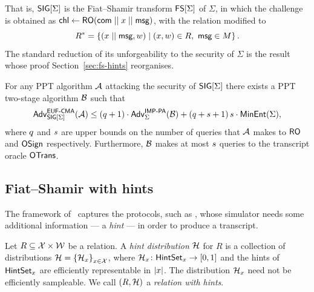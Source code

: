 That is, $\mathsf{SIG}[\Sigma]$ is the Fiat--Shamir transform $\mathsf{FS}[\Sigma]$ of $\Sigma$,
in which the challenge is obtained as $\mathsf{chl} \gets \mathsf{RO}(\mathsf{com} \mathrel{||} x \mathrel{||}
\textsf{msg})$, with the relation modified to
\begin{equation}
    R^* = \left\{(x \mathrel{||} \textsf{msg}, w) \;\middle|\; (x,w) \in R,\ \textsf{msg} \in M\right\}.
\end{equation}
The standard reduction of its unforgeability to the \IMPPA security of $\Sigma$
is the result whose proof Section~\ref{sec:fs-hints} reorganises.

\begin{lemma}\label{lem:aabn}
    For any PPT algorithm $\mathcal{A}$ attacking the \EUFCMA security of
    $\mathsf{SIG}[\Sigma]$ there exists a PPT two-stage algorithm $\mathcal{B}$ such that
    \begin{equation}\label{eq:aabn}
        \mathsf{Adv}^{\mathsf{EUF}\text{-}\mathsf{CMA}}_{\mathsf{SIG}[\Sigma]}(\mathcal{A}) \leq
        (q + 1) \cdot \mathsf{Adv}^{\mathsf{IMP}\text{-}\mathsf{PA}}_{\Sigma}(\mathcal{B})
        + (q + s + 1)\,s \cdot \mathsf{MinEnt}(\Sigma),
    \end{equation}
    where $q$ and $s$ are upper bounds on the number of queries
    that $\mathcal{A}$ makes to $\mathsf{RO}$ and $\mathsf{OSign}$ respectively.
    Furthermore, $\mathcal{B}$ makes at most $s$ queries to the transcript
    oracle $\mathsf{OTrans}$.
\end{lemma}

\subsection{Fiat--Shamir with hints}\label{sec:fs-with-hints}

The framework of~\cite{C:ABDPW25} captures the protocols, such as \sqisign{},
whose simulator needs some additional information --- a \emph{hint} --- in order
to produce a transcript.

\begin{definition}\label{def:hint-distr}
    Let $R \subseteq \mathcal{X} \times \mathcal{W}$ be a relation.
    A \emph{hint distribution} $\mathcal{H}$ for $R$ is a collection of
    distributions $\mathcal{H} = \left\{\mathcal{H}_x\right\}_{x \in \mathcal{X}}$, where
    $\mathcal{H}_x \colon \mathsf{HintSet}_x \rightarrow [0,1]$ and the hints of $\mathsf{HintSet}_x$
    are efficiently representable in $\lvert x \rvert$.
    The distribution $\mathcal{H}_x$ need not be efficiently sampleable.
    We call $(R, \mathcal{H})$ a \emph{relation with hints}.
\end{definition}

